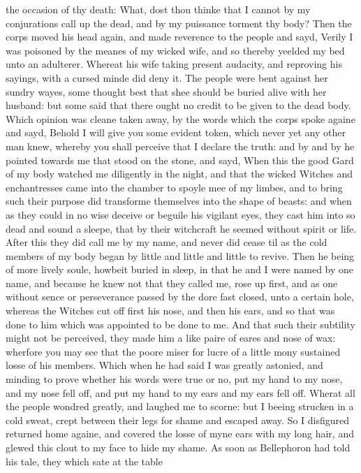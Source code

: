 the occasion of thy death: What, dost thou thinke that I cannot by my
conjurations call up the dead, and by my puissance torment thy body? Then the
corps moved his head again, and made reverence to the people and sayd, Verily I
was poisoned by the meanes of my wicked wife, and so thereby yeelded my bed
unto an adulterer. Whereat his wife taking present audacity, and reproving his
sayings, with a cursed minde did deny it. The people were bent against her
sundry wayes, some thought best that shee should be buried alive with her
husband: but some said that there ought no credit to be given to the dead body.
Which opinion was cleane taken away, by the words which the corps spoke againe
and sayd, Behold I will give you some evident token, which never yet any other
man knew, whereby you shall perceive that I declare the truth: and by and by he
pointed towards me that stood on the stone, and sayd, When this the good Gard
of my body watched me diligently in the night, and that the wicked Witches and
enchantresses came into the chamber to spoyle mee of my limbes, and to bring
such their purpose did transforme themselves into the shape of beasts: and when
as they could in no wise deceive or beguile his vigilant eyes, they cast him
into so dead and sound a sleepe, that by their witchcraft he seemed without
spirit or life. After this they did call me by my name, and never did cease til
as the cold members of my body began by little and little and little to revive.
Then he being of more lively soule, howbeit buried in sleep, in that he and I
were named by one name, and because he knew not that they called me, rose up
first, and as one without sence or perseverance passed by the dore fast closed,
unto a certain hole, whereas the Witches cut off first his nose, and then his
ears, and so that was done to him which was appointed to be done to me. And
that such their subtility might not be perceived, they made him a like paire of
eares and nose of wax: wherfore you may see that the poore miser for lucre of a
little mony sustained losse of his members. Which when he had said I was
greatly astonied, and minding to prove whether his words were true or no, put
my hand to my nose, and my nose fell off, and put my hand to my ears and my
ears fell off. Wherat all the people wondred greatly, and laughed me to scorne:
but I beeing strucken in a cold sweat, crept between their legs for shame and
escaped away. So I disfigured returned home againe, and covered the losse of
myne ears with my long hair, and glewed this clout to my face to hide my shame.
As soon as Bellephoron had told his tale, they which sate at the table
